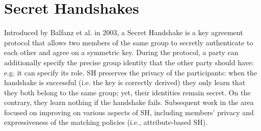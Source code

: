 \section{Secret Handshakes}\label{sec:sh}

Introduced by Balfanz et al. \cite{Balfanz} in 2003, a Secret Handshake is a key agreement protocol that allows two members of the same group to secretly authenticate to each other and agree on a symmetric key.
During the protocol, a party can additionally specify the precise group identity that the other party should have: e.g. it can specify its role.
\newline\newline
SH preserves the privacy of the participants: when the handshake is successful (i.e. the key is correctly derived) they only learn that they both belong to the same group; yet, their identities remain secret.
On the contrary, they learn nothing if the handshake fails.
\newline\newline
Subsequent work in the area focused on improving on various aspects of SH, including members' privacy and expressiveness of the matching policies (i.e., attribute-based SH).
